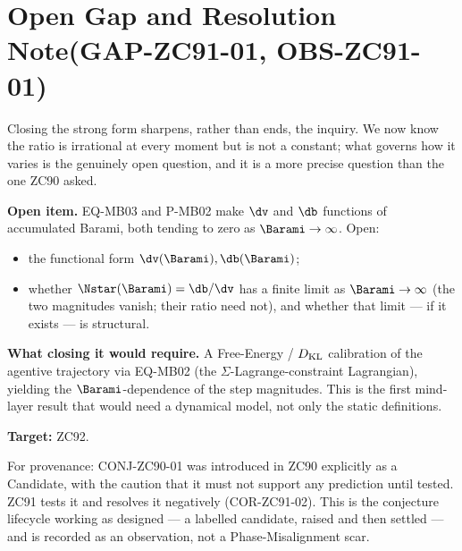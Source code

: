 \documentclass[12pt, a4paper]{article}
\begin{document}
\section{Open Gap and Resolution Note\quad(GAP-ZC91-01, OBS-ZC91-01)}
\label{sec:gapobs-zc91}

Closing the strong form sharpens, rather than ends, the inquiry. We now
know the ratio is irrational at every moment but is not a constant; what
governs how it varies is the genuinely open question, and it is a more
precise question than the one ZC90 asked.

\begin{openqbox}[title={GAP-ZC91-01: The Barami-History Functional}]
\textbf{Open item.} EQ-MB03 and P-MB02 make $\dv$ and $\db$ functions of
accumulated Barami, both tending to zero as $\Barami\to\infty$. Open:
\begin{itemize}[leftmargin=2em, noitemsep]
  \item the functional form $\dv(\Barami),\db(\Barami)$;
  \item whether $\Nstar(\Barami)=\db/\dv$ has a finite limit as
    $\Barami\to\infty$ (the two magnitudes vanish; their ratio need not),
    and whether that limit --- if it exists --- is structural.
\end{itemize}

\textbf{What closing it would require.} A Free-Energy / $D_{\rm KL}$
calibration of the agentive trajectory via EQ-MB02 (the
$\Sigma$-Lagrange-constraint Lagrangian), yielding the $\Barami$-dependence
of the step magnitudes. This is the first mind-layer result that would
need a dynamical model, not only the static definitions.

\textbf{Target:} ZC92.
\end{openqbox}

\begin{derivedbox}[title={OBS-ZC91-01: Resolution Note for CONJ-ZC90-01}]
For provenance: CONJ-ZC90-01 was introduced in ZC90 explicitly as a
Candidate, with the caution that it must not support any prediction until
tested. ZC91 tests it and resolves it negatively (COR-ZC91-02). This is
the conjecture lifecycle working as designed --- a labelled candidate,
raised and then settled --- and is recorded as an observation, not a
Phase-Misalignment scar.
\end{derivedbox}
\end{document}
